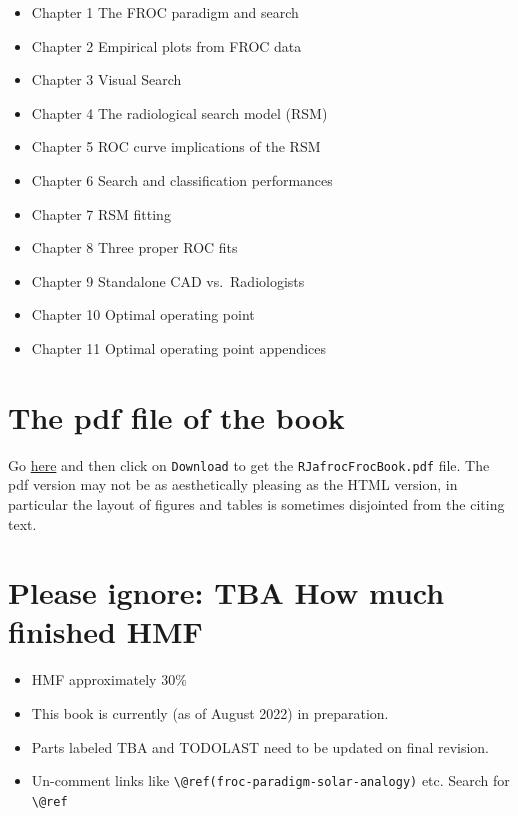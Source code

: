 \documentclass[
]{book}
\providecommand{\tightlist}{%
  \setlength{\itemsep}{0pt}\setlength{\parskip}{0pt}}
\begin{document}
\begin{itemize}
\tightlist
\item
  Chapter 1 The FROC paradigm and search
\item
  Chapter 2 Empirical plots from FROC data
\item
  Chapter 3 Visual Search
\item
  Chapter 4 The radiological search model (RSM)
\item
  Chapter 5 ROC curve implications of the RSM
\item
  Chapter 6 Search and classification performances
\item
  Chapter 7 RSM fitting
\item
  Chapter 8 Three proper ROC fits
\item
  Chapter 9 Standalone CAD vs.~Radiologists
\item
  Chapter 10 Optimal operating point
\item
  Chapter 11 Optimal operating point appendices
\end{itemize}

\hypertarget{the-pdf-file-of-the-book}{%
\section{The pdf file of the book}\label{the-pdf-file-of-the-book}}

Go \href{https://github.com/dpc10ster/RJafrocFrocBook/blob/gh-pages/RJafrocFrocBook.pdf}{here} and then click on \texttt{Download} to get the \texttt{RJafrocFrocBook.pdf} file. The pdf version may not be as aesthetically pleasing as the HTML version, in particular the layout of figures and tables is sometimes disjointed from the citing text.

\hypertarget{please-ignore-tba-how-much-finished-hmf}{%
\section{Please ignore: TBA How much finished HMF}\label{please-ignore-tba-how-much-finished-hmf}}

\begin{itemize}
\tightlist
\item
  HMF approximately 30\%
\item
  This book is currently (as of August 2022) in preparation.
\item
  Parts labeled TBA and TODOLAST need to be updated on final revision.
\item
  Un-comment links like \texttt{\textbackslash{}@ref(froc-paradigm-solar-analogy)} etc. Search for \texttt{\textbackslash{}@ref}
\end{itemize}
\end{document}
